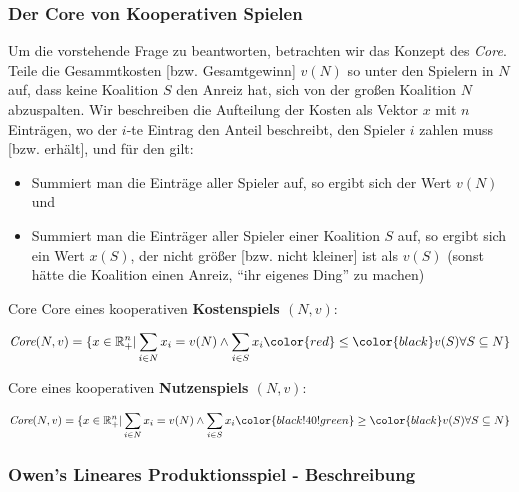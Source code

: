 \documentclass{panikzettel}
\begin{document}
\subsubsection{Der Core von Kooperativen Spielen}

Um die vorstehende Frage zu beantworten, betrachten wir das Konzept des \emph{Core}. Teile die Gesammtkosten [bzw. Gesamtgewinn] $v(N)$ so unter den Spielern in $N$ auf, dass keine Koalition $S$ den Anreiz hat, sich von der großen Koalition $N$ abzuspalten. Wir beschreiben die Aufteilung der Kosten als Vektor $x$ mit $n$ Einträgen, wo der $i$-te Eintrag den Anteil beschreibt, den Spieler $i$ zahlen muss [bzw. erhält], und für den gilt:

\begin{itemize}
	\item Summiert man die Einträge aller Spieler auf, so ergibt sich der Wert $v(N)$ und
	\item Summiert man die Einträger aller Spieler einer Koalition $S$ auf, so ergibt sich ein Wert $x(S)$, der nicht größer [bzw. nicht kleiner] ist als $v(S)$ (sonst hätte die Koalition einen Anreiz, ``ihr eigenes Ding'' zu machen)
\end{itemize}	

\begin{defi}{Core}
	Core eines kooperativen \textbf{\color{red} Kostenspiels $(N,v)$}:
	
	\[ \textit{Core}(N,v) = \{x \in \mathbb{R}_+^n | \sum_{i \in N} x_i = v(N) \land \sum_{i \in S} x_i \color{red} \leq \color{black} v(S) \forall S \subseteq N \} \]
	
	Core eines kooperativen \textbf{\color{black!40!green} Nutzenspiels $(N,v)$}:
	
	\[ \textit{Core}(N,v) = \{x \in \mathbb{R}_+^n | \sum_{i \in N} x_i = v(N) \land \sum_{i \in S} x_i \color{black!40!green} \geq \color{black} v(S) \forall S \subseteq N \} \]
	
\end{defi}

\subsubsection{Owen's Lineares Produktionsspiel - Beschreibung}
\end{document}
